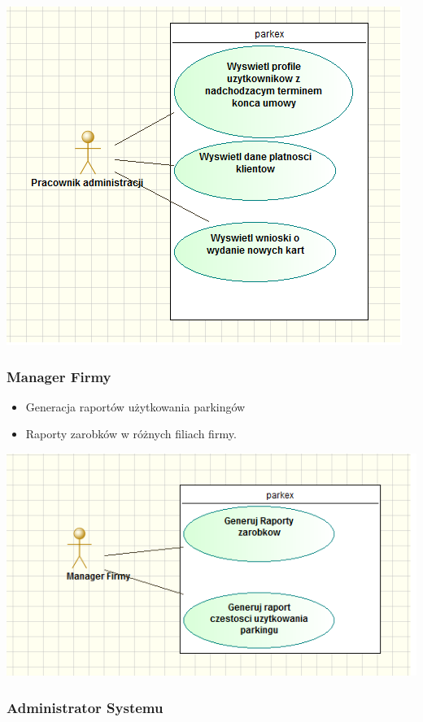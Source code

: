 \documentclass[paper=a4, fontsize=11pt]{scrartcl} %
\begin{document}
\includegraphics[scale=0.7]{padm}

\subsubsection{Manager Firmy}

\begin{itemize}
\item Generacja raportów użytkowania parkingów
\item Raporty zarobków w różnych filiach firmy.
\end{itemize}

\includegraphics[scale=0.7]{mana}

\subsubsection{Administrator Systemu}
\end{document}
